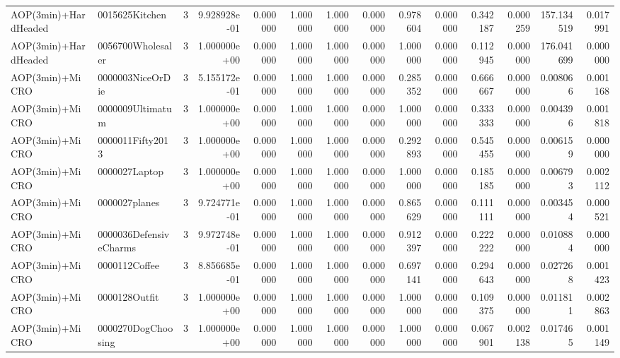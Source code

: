 \begin{tabular}{llrr|r|rr|rr|rr|rrr}
     AOP(3min)+HardHeaded &         0015625Kitchen &       3 & 9.928928e-01 & 0.000000 & 1.000000 &      1.000000 & 0.000000 &      0.978604 & 0.000000 &      0.342187 &    0.000259 &   157.134519 &    0.017991 \\
     AOP(3min)+HardHeaded &      0056700Wholesaler &       3 & 1.000000e+00 & 0.000000 & 1.000000 &      1.000000 & 0.000000 &      1.000000 & 0.000000 &      0.112945 &    0.000000 &   176.041699 &    0.000000 \\
          AOP(3min)+MiCRO &       0000003NiceOrDie &       3 & 5.155172e-01 & 0.000000 & 1.000000 &      1.000000 & 0.000000 &      0.285352 & 0.000000 &      0.666667 &    0.000000 &     0.008066 &    0.001168 \\
          AOP(3min)+MiCRO &       0000009Ultimatum &       3 & 1.000000e+00 & 0.000000 & 1.000000 &      1.000000 & 0.000000 &      1.000000 & 0.000000 &      0.333333 &    0.000000 &     0.004396 &    0.001818 \\
          AOP(3min)+MiCRO &       0000011Fifty2013 &       3 & 1.000000e+00 & 0.000000 & 1.000000 &      1.000000 & 0.000000 &      0.292893 & 0.000000 &      0.545455 &    0.000000 &     0.006159 &    0.000000 \\
          AOP(3min)+MiCRO &          0000027Laptop &       3 & 1.000000e+00 & 0.000000 & 1.000000 &      1.000000 & 0.000000 &      1.000000 & 0.000000 &      0.185185 &    0.000000 &     0.006793 &    0.002112 \\
          AOP(3min)+MiCRO &          0000027planes &       3 & 9.724771e-01 & 0.000000 & 1.000000 &      1.000000 & 0.000000 &      0.865629 & 0.000000 &      0.111111 &    0.000000 &     0.003454 &    0.000521 \\
          AOP(3min)+MiCRO & 0000036DefensiveCharms &       3 & 9.972748e-01 & 0.000000 & 1.000000 &      1.000000 & 0.000000 &      0.912397 & 0.000000 &      0.222222 &    0.000000 &     0.010884 &    0.000000 \\
          AOP(3min)+MiCRO &          0000112Coffee &       3 & 8.856685e-01 & 0.000000 & 1.000000 &      1.000000 & 0.000000 &      0.697141 & 0.000000 &      0.294643 &    0.000000 &     0.027268 &    0.001423 \\
          AOP(3min)+MiCRO &          0000128Outfit &       3 & 1.000000e+00 & 0.000000 & 1.000000 &      1.000000 & 0.000000 &      1.000000 & 0.000000 &      0.109375 &    0.000000 &     0.011811 &    0.002863 \\
          AOP(3min)+MiCRO &     0000270DogChoosing &       3 & 1.000000e+00 & 0.000000 & 1.000000 &      1.000000 & 0.000000 &      1.000000 & 0.000000 &      0.067901 &    0.002138 &     0.017465 &    0.001149 \\

\end{tabular}
